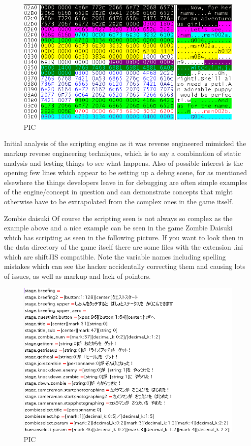\documentclass[
]{book}
\begin{document}
\begin{figure}
\centering
\includegraphics{images/125_home_fast6191_romhackingguide_unrenamed_fil___original_borders_romhackguidetextscripting2.png}
\caption{PIC}
\end{figure}

Initial analysis of the scripting engine as it was reverse engineered mimicked the markup reverse engineering techniques, which is to say a combination of static analysis and testing things to see what happens. Also of possible interest is the opening few lines which appear to be setting up a debug scene, for as mentioned elsewhere the things developers leave in for debugging are often simple examples of the engine/concept in question and can demonstrate concepts that might otherwise have to be extrapolated from the complex ones in the game itself.

Zombie daisuki Of course the scripting seen is not always so complex as the example above and a nice example can be seen in the game Zombie Daisuki which has scripting as seen in the following picture. If you want to look then in the data directory of the game itself there are some files with the extension .ini which are shiftJIS compatible. Note the variable names including spelling mistakes which can see the hacker accidentally correcting them and causing lots of issues, as well as markup and lack of pointers.

\begin{figure}
\centering
\includegraphics{images/126_home_fast6191_romhackingguide_unrenamed_fil____borders_romhackingguidescriptingzombiedai1.png}
\caption{PIC}
\end{figure}
\end{document}
